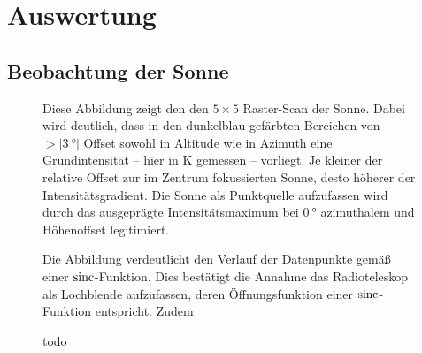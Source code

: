 \section{Auswertung}
    \subsection{Beobachtung der Sonne}
    \begin{figure}[H]
        \centering
        
        \caption[Raster-Scan der Sonne]{Diese Abbildung zeigt den den $5 \times 5$ Raster-Scan der Sonne. Dabei wird deutlich, dass in den dunkelblau gefärbten Bereichen von $>\vert \SI{3}{\degree}\vert$ Offset sowohl in Altitude wie in Azimuth eine Grundintensität -- hier in \si{\kelvin} gemessen -- vorliegt. Je kleiner der relative Offset zur im Zentrum fokussierten Sonne, desto höherer der Intensitätsgradient. Die Sonne als Punktquelle aufzufassen wird durch das ausgeprägte Intensitätsmaximum bei $\SI{0}{\degree}$ azimuthalem und Höhenoffset legitimiert.}
        \label{fig:Sonnenabbild}
    \end{figure}

    \begin{figure}[H]
        \centering
        
        \caption[Kreuz-Scan der Sonne, Azimuthaler Offset]{Die Abbildung verdeutlicht den Verlauf der Datenpunkte gemäß einer $\operatorname{sinc}$-Funktion. Dies bestätigt die Annahme das Radioteleskop als Lochblende aufzufassen, deren Öffnungsfunktion einer $\operatorname{sinc}$-Funktion entspricht. Zudem }
        \label{fig:Sonnenkreuz_Az}
    \end{figure}

    \begin{figure}[H]
        \centering
        
        \caption[Kreuz-Scan der Sonne, Altitude Offset]{todo}
        \label{fig:Sonnenkreuz_Alt}
    \end{figure}